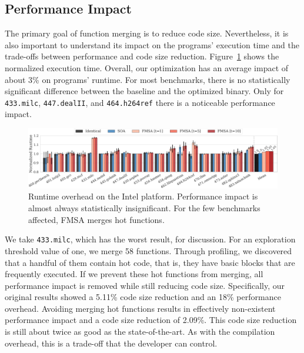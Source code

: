 \subsection{Performance Impact}

The primary goal of function merging is to reduce code size. Nevertheless, it is also important to understand its impact on the programs'
execution time and the trade-offs between performance and code size reduction. Figure~\ref{fig:runtime-impact} shows the normalized
execution time. Overall, our optimization has an average impact of about 3\% on programs' runtime. For most benchmarks, there is no
statistically significant difference between the baseline and the optimized binary. Only for \texttt{433.milc}, \texttt{447.dealII}, and
\texttt{464.h264ref} there is a noticeable performance impact.

\begin{figure}[h]
  \centering
  \includegraphics[width=\linewidth]{src/merging-optimisation/figs/runtime-impact.pdf}
  \caption{Runtime overhead on the Intel platform. Performance impact is almost always statistically insignificant. For the few benchmarks affected, FMSA merges hot functions.}
  \label{fig:runtime-impact}
\end{figure}


We take \texttt{433.milc}, which has the worst result, for discussion. For an exploration threshold value of one, we merge 58 functions.
Through profiling, we discovered that a handful of them contain hot code, that is, they have basic blocks that are frequently executed. If we prevent these hot
functions from merging, all performance impact is removed while still reducing code size. Specifically, our original results showed a
5.11\% code size reduction and an 18\% performance overhead.
Avoiding merging hot functions results in effectively non-existent performance impact and
a code size reduction of 2.09\%.
This code size reduction is still about twice as good as the state-of-the-art. As with the
compilation overhead, this is a trade-off that the developer can control.
